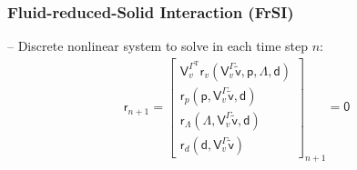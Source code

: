 \documentclass[a4paper,12pt]{report}
\newcommand{\bs}[1]{\boldsymbol{#1}}
\newcommand{\Gm}{\mathit{\Gamma}}
\newcommand{\ROP}{\bs{\mathsf{r}}}
\newcommand{\LMZ}{\bs{\mathsf{\Lambda}}}
\begin{document}
\subsubsection{Fluid-reduced-Solid Interaction (FrSI)}\label{fluid-reduced-solid-interaction-frsi}


-- Discrete nonlinear system to solve in each time step $n$:
\begin{equation}
\label{equation-nonlin-sys-frsi-0d}
\begin{aligned}
\ROP_{n+1} = \begin{bmatrix} \bs{\mathsf{V}}_{v}^{\Gm^\mathrm{T}}\ROP_{v}(\bs{\mathsf{V}}_{v}^{\Gm}\tilde{\bs{\mathsf{v}}},\bs{\mathsf{p}},\LMZ,\bs{\mathsf{d}}) \\ \ROP_{p}(\bs{\mathsf{p}},\bs{\mathsf{V}}_{v}^{\Gm}\tilde{\bs{\mathsf{v}}},\bs{\mathsf{d}}) \\ \ROP_{\mathit{\Lambda}}(\LMZ,\bs{\mathsf{V}}_{v}^{\Gm}\tilde{\bs{\mathsf{v}}},\bs{\mathsf{d}}) \\ \ROP_{d}(\bs{\mathsf{d}},\bs{\mathsf{V}}_{v}^{\Gm}\tilde{\bs{\mathsf{v}}}) \end{bmatrix}_{n+1} = \bs{\mathsf{0}}
\end{aligned}
\end{equation}
\end{document}

